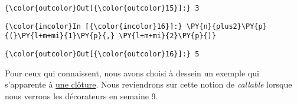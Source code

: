 \begin{Verbatim}[commandchars=\\\{\},frame=single,framerule=0.3mm,rulecolor=\color{cellframecolor}]
{\color{outcolor}Out[{\color{outcolor}15}]:} 3
\end{Verbatim}
            
    \begin{Verbatim}[commandchars=\\\{\},frame=single,framerule=0.3mm,rulecolor=\color{cellframecolor}]
{\color{incolor}In [{\color{incolor}16}]:} \PY{n}{plus2}\PY{p}{(}\PY{l+m+mi}{1}\PY{p}{,} \PY{l+m+mi}{2}\PY{p}{)}
\end{Verbatim}


\begin{Verbatim}[commandchars=\\\{\},frame=single,framerule=0.3mm,rulecolor=\color{cellframecolor}]
{\color{outcolor}Out[{\color{outcolor}16}]:} 5
\end{Verbatim}
            
    Pour ceux qui connaissent, nous avons choisi à dessein un exemple qui
s'apparente à
\href{http://en.wikipedia.org/wiki/Closure_\%28computer_programming\%29}{une
clôture}. Nous reviendrons sur cette notion de \emph{callable} lorsque
nous verrons les décorateurs en semaine 9.


    
    
    
